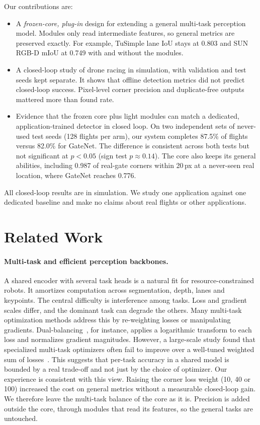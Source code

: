 \documentclass[10pt,twocolumn,letterpaper]{article}
\begin{document}
Our contributions are:
\begin{itemize}
    \item A \emph{frozen-core, plug-in} design for extending a general multi-task perception model. Modules only read intermediate features, so general metrics are preserved exactly. For example, TuSimple lane IoU stays at 0.803 and SUN RGB-D mIoU at 0.749 with and without the modules.
    \item A closed-loop study of drone racing in simulation, with validation and test seeds kept separate. It shows that offline detection metrics did not predict closed-loop success. Pixel-level corner precision and duplicate-free outputs mattered more than found rate.
    \item Evidence that the frozen core plus light modules can match a dedicated, application-trained detector in closed loop. On two independent sets of never-used test seeds (128 flights per arm), our system completes 87.5\% of flights versus 82.0\% for GateNet. The difference is consistent across both tests but not significant at $p<0.05$ (sign test $p\approx0.14$). The core also keeps its general abilities, including 0.987 of real-gate corners within 20\,px at a never-seen real location, where GateNet reaches 0.776.
\end{itemize}
All closed-loop results are in simulation. We study one application against one dedicated baseline and make no claims about real flights or other applications.

\section{Related Work}
\label{sec:related_work}
\paragraph{Multi-task and efficient perception backbones.}
A shared encoder with several task heads is a natural fit for resource-constrained robots. It amortizes computation across segmentation, depth, lanes and keypoints. The central difficulty is interference among tasks. Loss and gradient scales differ, and the dominant task can degrade the others. Many multi-task optimization methods address this by re-weighting losses or manipulating gradients. Dual-balancing~\cite{Lin2023DualbalancingMultitask}, for instance, applies a logarithmic transform to each loss and normalizes gradient magnitudes. However, a large-scale study found that specialized multi-task optimizers often fail to improve over a well-tuned weighted sum of losses~\cite{Xin2022DoCurrent}. This suggests that per-task accuracy in a shared model is bounded by a real trade-off and not just by the choice of optimizer. Our experience is consistent with this view. Raising the corner loss weight (10, 40 or 100) increased the cost on general metrics without a measurable closed-loop gain. We therefore leave the multi-task balance of the core as it is. Precision is added outside the core, through modules that read its features, so the general tasks are untouched.
\end{document}
